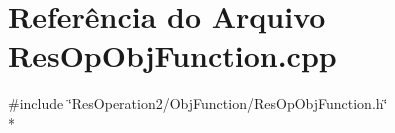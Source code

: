 \section{Referência do Arquivo Res\+Op\+Obj\+Function.\+cpp}
\label{_2_obj_function_2_res_op_obj_function_8cpp}
{\ttfamily \#include \char`\"{}Res\+Operation2/\+Obj\+Function/\+Res\+Op\+Obj\+Function.\+h\char`\"{}}\\*
